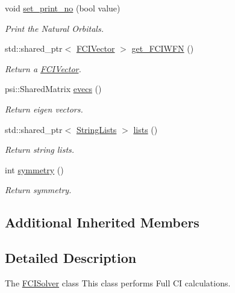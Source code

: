 \begin{DoxyCompactItemize}
\item 
void \mbox{\hyperlink{classforte_1_1_f_c_i_solver_a369b5d6855b896d2d1a743dd3ff2d9a6}{set\+\_\+print\+\_\+no}} (bool value)
\begin{DoxyCompactList}\small\item\em Print the Natural Orbitals. \end{DoxyCompactList}\item 
std\+::shared\+\_\+ptr$<$ \mbox{\hyperlink{classforte_1_1_f_c_i_vector}{F\+C\+I\+Vector}} $>$ \mbox{\hyperlink{classforte_1_1_f_c_i_solver_a4c6a278c51128b2f18ada5e08512deca}{get\+\_\+\+F\+C\+I\+W\+FN}} ()
\begin{DoxyCompactList}\small\item\em Return a \mbox{\hyperlink{classforte_1_1_f_c_i_vector}{F\+C\+I\+Vector}}. \end{DoxyCompactList}\item 
psi\+::\+Shared\+Matrix \mbox{\hyperlink{classforte_1_1_f_c_i_solver_a4e8a59d87c2c14b3d5a2ac0c0692f8d2}{evecs}} ()
\begin{DoxyCompactList}\small\item\em Return eigen vectors. \end{DoxyCompactList}\item 
std\+::shared\+\_\+ptr$<$ \mbox{\hyperlink{classforte_1_1_string_lists}{String\+Lists}} $>$ \mbox{\hyperlink{classforte_1_1_f_c_i_solver_a2a60c41f419e985cc8a4bd454ef0441e}{lists}} ()
\begin{DoxyCompactList}\small\item\em Return string lists. \end{DoxyCompactList}\item 
int \mbox{\hyperlink{classforte_1_1_f_c_i_solver_a24be33ae6c646782bff0e56ecc97fee9}{symmetry}} ()
\begin{DoxyCompactList}\small\item\em Return symmetry. \end{DoxyCompactList}\end{DoxyCompactItemize}
\subsection*{Additional Inherited Members}


\subsection{Detailed Description}
The \mbox{\hyperlink{classforte_1_1_f_c_i_solver}{F\+C\+I\+Solver}} class This class performs Full CI calculations. 

